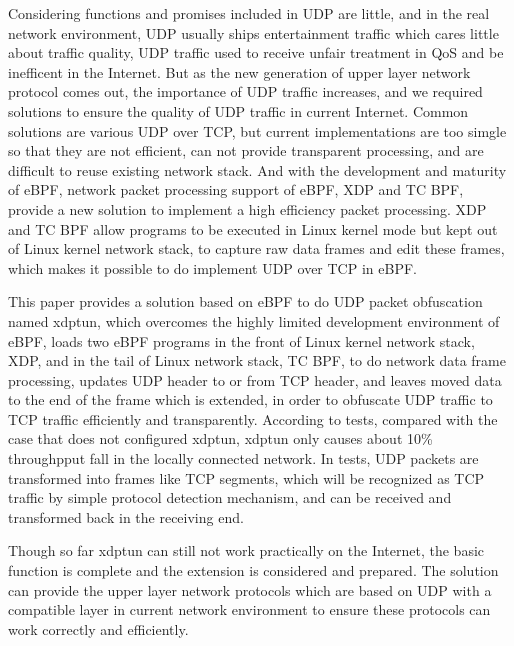 \begin{abstract*}
  Considering functions and promises included in UDP are little, and in the real network environment, UDP usually ships entertainment traffic which cares little about traffic quality, UDP traffic used to receive unfair treatment in QoS and be inefficent in the Internet.
  But as the new generation of upper layer network protocol comes out, the importance of UDP traffic increases, and we required solutions to ensure the quality of UDP traffic in current Internet.
  Common solutions are various UDP over TCP, but current implementations are too simgle so that they are not efficient, can not provide transparent processing, and are difficult to reuse existing network stack.
  And with the development and maturity of eBPF, network packet processing support of eBPF, XDP and TC BPF, provide a new solution to implement a high efficiency packet processing.
  XDP and TC BPF allow programs to be executed in Linux kernel mode but kept out of Linux kernel network stack, to capture raw data frames and edit these frames, which makes it possible to do implement UDP over TCP in eBPF.

  This paper provides a solution based on eBPF to do UDP packet obfuscation named xdptun, which overcomes the highly limited development environment of eBPF, loads two eBPF programs in the front of Linux kernel network stack, XDP, and in the tail of Linux network stack, TC BPF, to do network data frame processing, updates UDP header to or from TCP header, and leaves moved data to the end of the frame which is extended, in order to obfuscate UDP traffic to TCP traffic efficiently and transparently.
  According to tests, compared with the case that does not configured xdptun, xdptun only causes about 10\% throughpput fall in the locally connected network.
  In tests, UDP packets are transformed into frames like TCP segments, which will be recognized as TCP traffic by simple protocol detection mechanism, and can be received and transformed back in the receiving end.

  Though so far xdptun can still not work practically on the Internet, the basic function is complete and the extension is considered and prepared.
  The solution can provide the upper layer network protocols which are based on UDP with a compatible layer in current network environment to ensure these protocols can work correctly and efficiently.
\end{abstract*}
